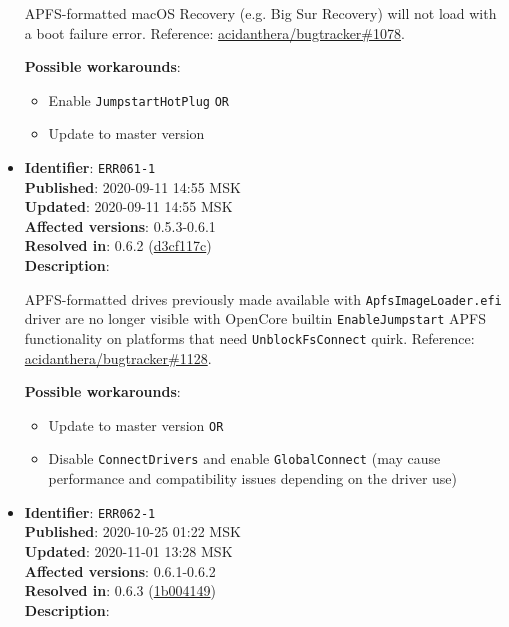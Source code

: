 \documentclass[]{article}
\providecommand{\tightlist}{%
  \setlength{\itemsep}{0pt}\setlength{\parskip}{0pt}}
\begin{document}
\begin{itemize}
  APFS-formatted macOS Recovery (e.g. Big Sur Recovery) will not load with a boot failure error. Reference:
  \href{https://github.com/acidanthera/bugtracker/issues/1078}{acidanthera/bugtracker\#1078}.

  \textbf{Possible workarounds}:
  \begin{itemize}
    \tightlist

    \item Enable \texttt{JumpstartHotPlug} \texttt{OR}
    \item Update to master version
  \end{itemize}

\item
  \textbf{Identifier}: \texttt{ERR061-1} \\
  \textbf{Published}: 2020-09-11 14:55 MSK \\
  \textbf{Updated}: 2020-09-11 14:55 MSK \\
  \textbf{Affected versions}: 0.5.3-0.6.1 \\
  \textbf{Resolved in}: 0.6.2 (\href{https://github.com/acidanthera/OpenCorePkg/commit/d3cf117c8661a4eda1863ca1fcdfae5c277974db}{d3cf117c}) \\
  \textbf{Description}:

  APFS-formatted drives previously made available with \texttt{ApfsImageLoader.efi}
  driver are no longer visible with OpenCore builtin \texttt{EnableJumpstart} APFS
  functionality on platforms that need \texttt{UnblockFsConnect} quirk. Reference:
  \href{https://github.com/acidanthera/bugtracker/issues/1128}{acidanthera/bugtracker\#1128}.

  \textbf{Possible workarounds}:
  \begin{itemize}
    \tightlist

    \item Update to master version \texttt{OR}
    \item Disable \texttt{ConnectDrivers} and enable \texttt{GlobalConnect} (may cause
      performance and compatibility issues depending on the driver use)

  \end{itemize}

\item
  \textbf{Identifier}: \texttt{ERR062-1} \\
  \textbf{Published}: 2020-10-25 01:22 MSK \\
  \textbf{Updated}: 2020-11-01 13:28 MSK \\
  \textbf{Affected versions}: 0.6.1-0.6.2 \\
  \textbf{Resolved in}: 0.6.3 (\href{https://github.com/acidanthera/OpenCorePkg/commit/1b0041493d4693f9505aa6415d93079ea59f7ab0}{1b004149}) \\
  \textbf{Description}:


\end{itemize}
\end{document}
